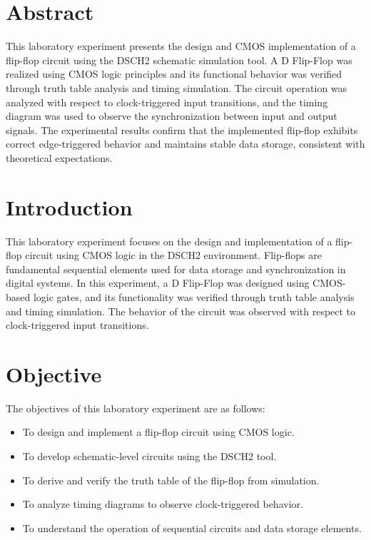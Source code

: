 \documentclass[12pt]{article}
\begin{document}
\tableofcontents
\thispagestyle{empty}
\clearpage
{}

\section*{\center Abstract}
This laboratory experiment presents the design and CMOS implementation of a flip-flop circuit using the DSCH2 schematic simulation tool. A D Flip-Flop was realized using CMOS logic principles and its functional behavior was verified through truth table analysis and timing simulation. The circuit operation was analyzed with respect to clock-triggered input transitions, and the timing diagram was used to observe the synchronization between input and output signals. The experimental results confirm that the implemented flip-flop exhibits correct edge-triggered behavior and maintains stable data storage, consistent with theoretical expectations.


\section{Introduction}
This laboratory experiment focuses on the design and implementation of a flip-flop circuit using CMOS logic in the DSCH2 environment. Flip-flops are fundamental sequential elements used for data storage and synchronization in digital systems. In this experiment, a D Flip-Flop was designed using CMOS-based logic gates, and its functionality was verified through truth table analysis and timing simulation. The behavior of the circuit was observed with respect to clock-triggered input transitions.

\section{Objective}
The objectives of this laboratory experiment are as follows:
\begin{itemize}
    \item To design and implement a flip-flop circuit using CMOS logic.
    \item To develop schematic-level circuits using the DSCH2 tool.
    \item To derive and verify the truth table of the flip-flop from simulation.
    \item To analyze timing diagrams to observe clock-triggered behavior.
    \item To understand the operation of sequential circuits and data storage elements.
\end{itemize}
\end{document}
